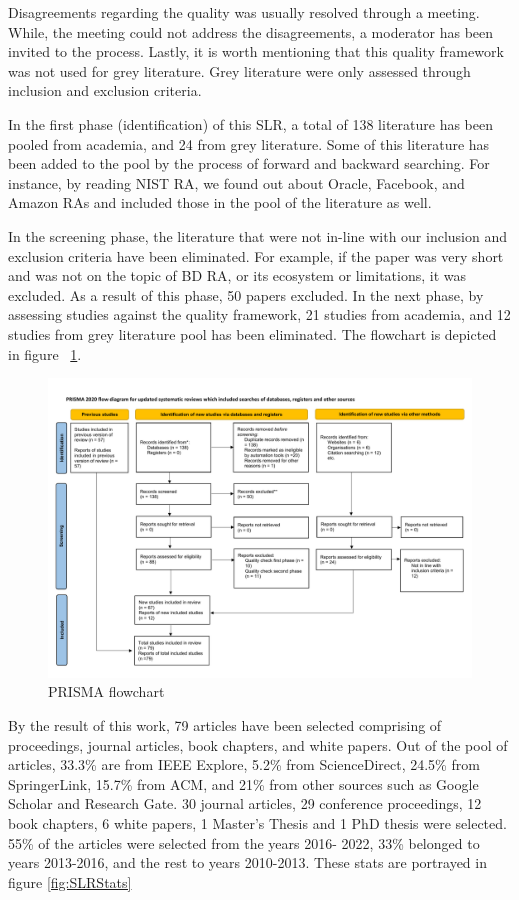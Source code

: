 \documentclass[review]{elsarticle}
\begin{document}
Disagreements regarding the quality was usually resolved through a meeting. While, the meeting could not address the disagreements, a moderator has been invited to the process. Lastly, it is worth mentioning that this quality framework was not used for grey literature. Grey literature were only assessed through inclusion and exclusion criteria. 

In the first phase (identification) of this SLR, a total of 138 literature has been pooled from academia, and 24 from grey literature. Some of this literature has been added to the pool by the process of forward and backward searching. For instance, by reading NIST RA, we found out about Oracle, Facebook, and Amazon RAs and included those in the pool of the literature as well. 

In the screening phase, the literature that were not in-line with our inclusion and exclusion criteria have been eliminated. For example, if the paper was very short and was not on the topic of BD RA, or its ecosystem or limitations, it was excluded. As a result of this phase, 50 papers excluded. In the next phase, by assessing studies against the quality framework, 21 studies from academia, and 12 studies from grey literature pool has been eliminated. The flowchart is depicted in figure ~\ref{fig:PRISMA}.

\begin{figure}[t]
    \includegraphics[width=13cm]{PRISMA/PRISMA_Flow_Diagram.pdf}
    \caption{PRISMA flowchart}
    \label{fig:PRISMA}
\end{figure}

By the result of this work, 79 articles have been selected comprising of proceedings, journal articles, book chapters, and white papers. Out of the pool of articles, 33.3\% are from IEEE Explore, 5.2\% from ScienceDirect, 24.5\% from SpringerLink, 15.7\% from ACM, and 21\% from other sources such as Google Scholar and Research Gate. 30 journal articles, 29 conference proceedings, 12 book chapters, 6 white papers, 1 Master’s Thesis and 1 PhD thesis were selected. 55\% of the articles were selected from the years 2016- 2022, 33\% belonged to years 2013-2016, and the rest to years 2010-2013. These stats are portrayed in figure \ref{fig:SLRStats}
\end{document}
